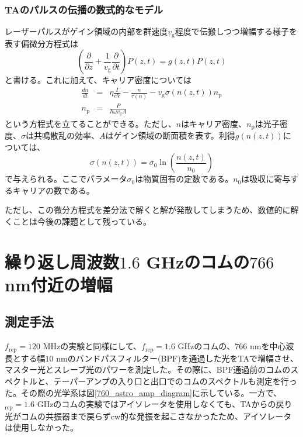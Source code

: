 \documentclass[uplatex, dvipdfmx, a4paper, report, papersize, 11pt]{jsbook}
\begin{document}
\subsubsection{TAのパルスの伝播の数式的なモデル}
レーザーパルスがゲイン領域の内部を群速度$v_\mathrm{g}$程度で伝搬しつつ増幅する様子を表す偏微分方程式は
\begin{equation}
  \left(\frac{\partial}{\partial z} + \frac{1}{v_{\mathrm{g}}}\frac{\partial}{\partial t}\right)P(z,t) = g(z,t)P(z,t)
\end{equation}
と書ける。これに加えて、キャリア密度については
\begin{eqnarray}
  \frac{dn}{dt} &=& \eta \frac{I}{eV} - \frac{n}{\tau(n)}-v_{\mathrm{g}}\sigma(n(z,t))n_{\mathrm{p}}\\
  n_{\mathrm{p}} &=& \frac{P}{\hbar\omega v_{\mathrm{g}}A}
\end{eqnarray}
という方程式を立てることができる。ただし、$n$はキャリア密度、$n_{\mathrm{p}}$は光子密度、$\sigma$は共鳴散乱の効率、$A$はゲイン領域の断面積を表す。利得$g(n(z,t))$については、　
\begin{equation}
  \sigma(n(z,t)) = \sigma_0 \ln{\left( \frac{n(z,t)}{n_0}\right)}
\end{equation}
で与えられる。ここでパラメータ$\sigma_0$は物質固有の定数である。$n_0$は吸収に寄与するキャリアの数である。

ただし、この微分方程式を差分法で解くと解が発散してしまうため、数値的に解くことは今後の課題として残っている。

\section{繰り返し周波数$1.6$ GHzのコムの$766$ nm付近の増幅}
\subsection{測定手法}
$f_{\mathrm{rep}} = 120$ MHzの実験と同様にして、$f_{\mathrm{rep}} = 1.6$ GHzのコムの、$766$ nmを中心波長とする幅$10$ nmのバンドパスフィルター(BPF)を通過した光をTAで増幅させ、マスター光とスレーブ光のパワーを測定した。その際に、BPF通過前のコムのスペクトルと、テーパーアンプの入り口と出口でのコムのスペクトルも測定を行った。その際の光学系は図\ref{760_astro_amp_diagram}に示している。一方で、$_{\mathrm{rep}} = 1.6$ GHzのコムの実験ではアイソレータを使用しなくても、TAからの戻り光がコムの共振器まで戻らずcw的な発振を起こさなかったため、アイソレータは使用しなかった。\\
\end{document}
